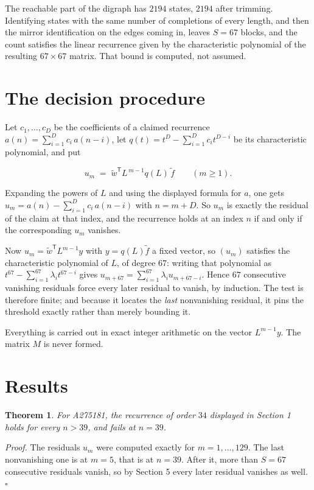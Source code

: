 \documentclass[11pt]{article}
\newtheorem{theorem}{Theorem}
\theoremstyle{definition}
\begin{document}
The reachable part of the digraph has $2194$ states, $2194$ after trimming. Identifying states with the same number of completions of every length, and then the mirror identification on the edges coming in, leaves $S = 67$ blocks, and the count satisfies the linear recurrence given by the characteristic polynomial of the resulting $67\times67$ matrix. That bound is computed, not assumed.

\section{The decision procedure}

Let $c_1,\dots,c_D$ be the coefficients of a claimed recurrence $a(n) = \sum_{i=1}^{D} c_i\,a(n-i)$, let $q(t) = t^{D} - \sum_{i=1}^{D} c_i t^{D-i}$ be its characteristic polynomial, and put

\[u_m \;=\; \tilde w^{\mathsf T} L^{\,m-1} q(L)\,\tilde f \qquad (m \ge 1).\]

Expanding the powers of $L$ and using the displayed formula for $a$, one gets $u_m = a(n) - \sum_{i=1}^{D} c_i\,a(n-i)$ with $n = m + D$. So $u_m$ is exactly the residual of the claim at that index, and the recurrence holds at an index $n$ if and only if the corresponding $u_m$ vanishes.

Now $u_m = \tilde w^{\mathsf T} L^{m-1} y$ with $y = q(L)\tilde f$ a fixed vector, so $(u_m)$ satisfies the characteristic polynomial of $L$, of degree $67$: writing that polynomial as $t^{67} - \sum_{i=1}^{67} \lambda_i t^{67-i}$ gives $u_{m+67} = \sum_{i=1}^{67} \lambda_i u_{m+67-i}$. Hence $67$ consecutive vanishing residuals force every later residual to vanish, by induction. The test is therefore finite; and because it locates the {\itshape last} nonvanishing residual, it pins the threshold exactly rather than merely bounding it.

Everything is carried out in exact integer arithmetic on the vector $L^{m-1}y$. The matrix $M$ is never formed.

\section{Results}

\begin{theorem} For A275181, the recurrence of order $34$ displayed in Section 1 holds for every $n > 39$, and fails at $n = 39$.\end{theorem}

{\itshape Proof.} The residuals $u_m$ were computed exactly for $m = 1,\dots,129$. The last nonvanishing one is at $m = 5$, that is at $n = 39$. After it, more than $S = 67$ consecutive residuals vanish, so by Section 5 every later residual vanishes as well. $\square$
\end{document}
